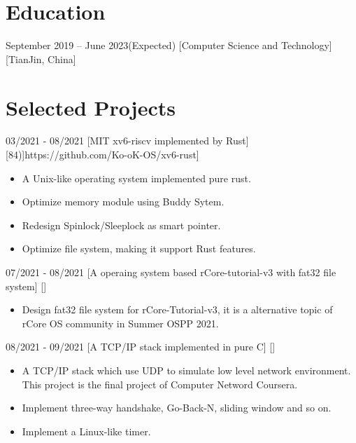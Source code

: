 \documentclass{chicv}
\begin{document}
\begin{basicinfo}
\end{basicinfo}

\section{Education}
  {September 2019 -- June 2023(Expected)}
  [Computer Science and Technology]
  [TianJin, China]



\section{Selected Projects}

  {03/2021 - 08/2021}
  [MIT xv6-riscv implemented by Rust]
  [\iconlink[\faGithub][Ko-oK/xv6-rust(\faIcon[regular]{star}84)]{https://github.com/Ko-oK-OS/xv6-rust}]
  \begin{itemize}
    \item A Unix-like operating system implemented pure rust. 
    \item Optimize memory module using Buddy Sytem.
    \item Redesign Spinlock/Sleeplock as smart pointer.
    \item Optimize file system, making it support Rust features.
  \end{itemize}

  {07/2021 - 08/2021}
  [A operaing system based rCore-tutorial-v3 with fat32 file system]
  []
  \begin{itemize}
    \item Design fat32 file system for rCore-Tutorial-v3, it is a alternative topic of rCore OS community in Summer OSPP 2021.
  \end{itemize}

  {08/2021 - 09/2021}
  [A TCP/IP stack implemented in pure C]
  []
  \begin{itemize}
    \item A TCP/IP stack which use UDP to simulate low level network environment. This project is the final project of Computer Netword Coursera.
    \item Implement three-way handshake, Go-Back-N, sliding window and so on.
    \item Implement a Linux-like timer.
  \end{itemize}
\end{document}
